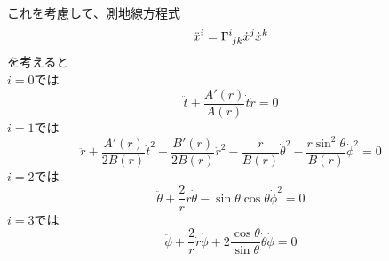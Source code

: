 \documentclass[dvipdfmx]{report} %
\begin{document}
これを考慮して、測地線方程式
\[
\ddot{x}^i = \tensor{\Gamma}{^i_{jk}} \dot{x}^j \dot{x}^k
\]
を考えると\\
$i=0$では
\begin{equation}
\ddot{t} + \frac{A'(r)}{A(r)} \dot{t} \dot{r} = 0
\end{equation}
$i=1$では
\begin{equation}
\ddot{r} + \frac{A'(r)}{2B(r)} \dot{t}^2 + \frac{B'(r)}{2B(r)} \dot{r}^2 - \frac{r}{B(r)}\dot{\theta}^2 - \frac{r\sin^2 \theta}{B(r)} \dot{\phi}^2= 0
\end{equation}
$i=2$では
\begin{equation}
\ddot{\theta} + \frac{2}{r} \dot{r} \dot{\theta} - \sin \theta \cos \theta \dot{\phi}^2 = 0
\end{equation}
$i=3$では
\begin{equation}
\ddot{\phi} + \frac{2}{r} \dot{r} \dot{\phi} + 2 \frac{\cos \theta}{\sin \theta} \dot{\theta} \dot{\phi} = 0
\end{equation}
\end{document}
